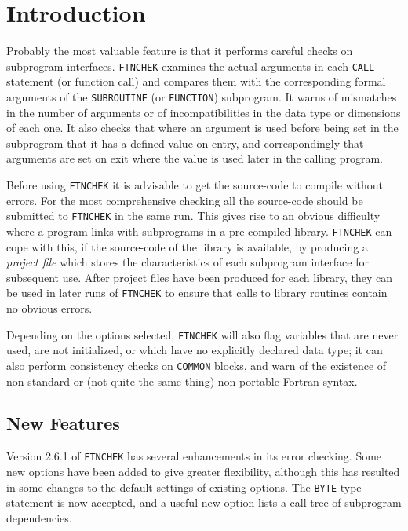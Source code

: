 \documentclass[twoside,11pt,nolof]{starlink}
\begin{document}
\scfrontmatter

\section{Introduction}

Probably the most valuable feature is that it performs careful checks on
subprogram interfaces. \texttt{FTNCHEK} examines the actual arguments in
each \texttt{CALL} statement (or function call) and compares them with the
corresponding formal arguments of the \texttt{SUBROUTINE} (or \texttt{FUNCTION}) subprogram. It warns of mismatches in the number of arguments
or of incompatibilities in the data type or dimensions of each one. It
also checks that where an argument is used before being set in the
subprogram that it has a defined value on entry, and correspondingly
that arguments are set on exit where the value is used later in the
calling program.

Before using \texttt{FTNCHEK} it is advisable to get the source-code to
compile without errors. For the most comprehensive checking all the
source-code should be submitted to \texttt{FTNCHEK} in the same run. This
gives rise to an obvious difficulty where a program links with
subprograms in a pre-compiled library.  \texttt{FTNCHEK} can cope with
this, if the source-code of the library is available, by producing a
\emph{project file} which stores the characteristics of each subprogram
interface for subsequent use. After project files have been produced for
each library, they can be used in later runs of \texttt{FTNCHEK} to ensure
that calls to library routines contain no obvious errors.

Depending on the options selected, \texttt{FTNCHEK} will also flag
variables that are never used, are not initialized, or which have no
explicitly declared data type; it can also perform consistency checks on
\texttt{COMMON} blocks, and warn of the existence of non-standard or (not
quite the same thing) non-portable Fortran syntax.

\subsection{New Features}

Version 2.6.1 of \texttt{FTNCHEK} has several enhancements in its error
checking. Some new options have been added to give greater flexibility,
although this has resulted in some changes to the default settings
of existing options.  The \texttt{BYTE} type statement is now accepted, and
a useful new option lists a call-tree of subprogram dependencies.
\end{document}
